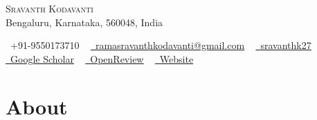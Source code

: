\documentclass[letterpaper,11pt]{article}
\begin{document}

\begin{center}
    {\Huge \scshape Sravanth Kodavanti} \\ 
    \bigskip
    Bengaluru, Karnataka, 560048, India  \\ \vspace{1pt}
    \bigskip
    
    \small \raisebox{-0.1\height}\faPhone\ +91-9550173710 ~ \href{mailto:ramasravanthkodavanti@gmail.com}{\raisebox{-0.2\height}\faEnvelope\  \underline{ramasravanthkodavanti@gmail.com}} ~ 
    \href{https://linkedin.com/in/sravanthk27/}{\raisebox{-0.2\height}\faLinkedin\ \underline{sravanthk27}}  ~
    \href{https://scholar.google.com/citations?user=SiOQawIAAAAJ&hl=en}{\raisebox{-0.2\height}\faGraduationCap\ \underline{Google Scholar}} ~
    \href{https://openreview.net/profile?id=~Sravanth_Kodavanti1}{\faPenNib \ \underline{OpenReview}} ~
    \href{https://sravanthkod.github.io/}{\raisebox{-0.2\height}\faGlobe\ \underline{Website}}

    \vspace{-8pt}
\end{center}
\vspace{-1pt}
\section{About}
\end{document}
